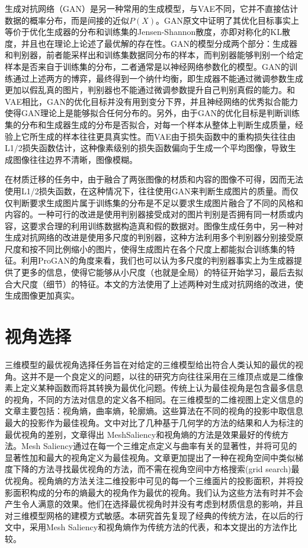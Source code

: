 \documentclass[UTF8,openany,AutoFakeBold,AutoFakeSlant,cs4size]{ctexbook}
\begin{document}
生成对抗网络（GAN）\cite{NIPS2014_5423}是另一种常用的生成模型，与VAE不同，它并不直接估计数据的概率分布，而是间接的近似$P(X)$。GAN原文中证明了其优化目标事实上等价于优化生成器的分布和训练集的Jensen-Shannon散度，亦即对称化的KL散度，并且也在理论上论述了最优解的存在性。GAN的模型分成两个部分：生成器和判别器，前者能采样出和训练集数据同分布的样本，而判别器能够判别一个给定样本是否来自于训练集的分布，二者通常是以神经网络参数化的模型。GAN的训练通过上述两方的博弈，最终得到一个纳什均衡，即生成器不能通过微调参数生成更加以假乱真的图片，判别器也不能通过微调参数提升自己判别真假的能力。和VAE相比，GAN的优化目标并没有用到变分下界，并且神经网络的优秀拟合能力使得GAN理论上是能够拟合任何分布的。另外，由于GAN的优化目标是判断训练集的分布和生成器生成的分布是否拟合，对每一个样本从整体上判断生成质量，经验上它所生成的样本往往更具真实性。而VAE由于损失函数中的重构损失往往由L1/2损失函数估计，这种像素级别的损失函数偏向于生成一个平均图像，导致生成图像往往边界不清晰，图像模糊。

在材质迁移的任务中，由于融合了两张图像的材质和内容的图像不可得，因而无法使用L1/2损失函数，在这种情况下，往往使用GAN来判断生成图片的质量。而仅仅判断要求生成图片属于训练集的分布是不足以要求生成图片融合了不同的风格和内容的。一种可行的改进是使用判别器接受成对的图片判别是否拥有同一材质或内容\cite{ma2017pose}，这要求合理的利用训练数据构造真和假的数据对。图像生成任务中，另一种对生成对抗网络的改进是使用多尺度的判别器，这种方法利用多个判别器分别接受原尺度和按不同比例缩小的图片，使得生成图片在各个尺度上都能拟合训练集的特征。利用ProGAN\cite{Karras2017ProgressiveGO}的角度来看，我们也可以认为多尺度的判别器事实上为生成器提供了更多的信息，使得它能够从小尺度（也就是全局）的特征开始学习，最后去拟合大尺度（细节）的特征。本文的方法使用了上述两种对生成对抗网络的改进，使生成图像更加真实。


\section{视角选择}

三维模型的最优视角选择任务旨在对给定的三维模型给出符合人类认知的最优的视角。这并不是一个良定义的问题，以往的研究方向往往采用在三维顶点或是二维像素上定义某种函数而将其转换为最优化问题。传统上认为最佳视角是包含最多信息的视角，不同的方法对信息的定义各不相同。在三维模型的二维视图上定义信息的文章主要包括：视角熵\cite{Vzquez2003AutomaticVS}，曲率熵\cite{Page2003ShapeAA}，轮廓熵\cite{Page2003ShapeAA}。这些算法在不同的视角的投影中取信息最大的投影作为最佳视角。\cite{Dutagaci2010ABF}文中对比了几种基于几何学的方法的结果和人为标注的最优视角的差别，文章得出 MeshSaliency\cite{Lee2005MeshS}和视角熵\cite{Vzquez2003AutomaticVS}的方法是效果最好的传统方法。Mesh Saliency\cite{Lee2005MeshS}通过在每一个三维定点定义与曲率有关的显著性，并将可见的显著性加和最大的视角定义为最佳视角。文章更加提出了一种在视角空间中类似梯度下降的方法寻找最优视角的方法，而不需在视角空间中方格搜索(grid search)最优视角。视角熵\cite{Vzquez2003AutomaticVS}的方法关注二维投影中可见的每一个三维面片的投影面积，并将投影面积构成的分布的熵最大的视角作为最优的视角。我们认为这些方法有时并不会产生令人满意的效果。他们在选择最优视角时并没有考虑到材质信息的影响，并且对三维模型网格的建模方式敏感。本研究首先复现了经典的传统方法，在以后的行文中，采用Mesh Saliency和视角熵作为传统方法的代表，和本文提出的方法作比较。
\end{document}
